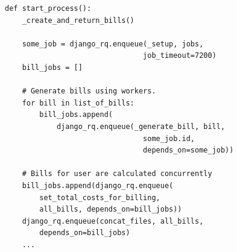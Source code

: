\begin{minipage}{0.95\linewidth}
    \begin{lstlisting}[caption={Usage of job scheduling in implementation to be able to batch operations \cite{MicrosoftAPI}}, label={BatchOperationsCode}]
def start_process():
    _create_and_return_bills()

    some_job = django_rq.enqueue(_setup, jobs,
                                job_timeout=7200)
    bill_jobs = []

    # Generate bills using workers.
    for bill in list_of_bills:
        bill_jobs.append(
            django_rq.enqueue(_generate_bill, bill, 
                                some_job.id,
                                depends_on=some_job))
                              
    # Bills for user are calculated concurrently
    bill_jobs.append(django_rq.enqueue(
        set_total_costs_for_billing, 
        all_bills, depends_on=bill_jobs))
    django_rq.enqueue(concat_files, all_bills, 
        depends_on=bill_jobs)
    ...
\end{lstlisting}
\end{minipage}

